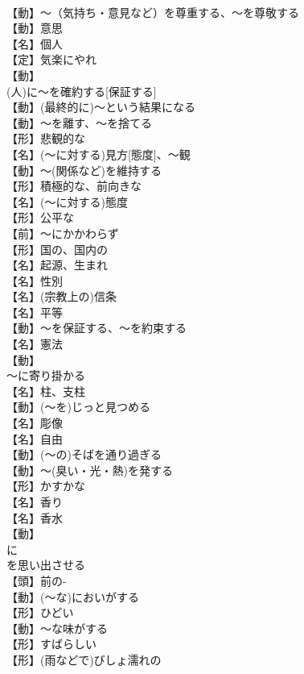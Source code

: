 \documentclass[8pt]{extreport}
\begin{document}
\begin{CJK}{UTF8}{min}
\\	【動】～（気持ち・意見など）を尊重する、～を尊敬する
\\	【動】意思
\\	【名】個人
\\	【定】気楽にやれ
\\	【動】
\\	(人)に～を確約する[保証する]
\\	【動】(最終的に)～という結果になる
\\	【動】～を離す、～を捨てる
\\	【形】悲観的な
\\	【名】(～に対する)見方[態度]、～観
\\	【動】～(関係など)を維持する
\\	【形】積極的な、前向きな
\\	【名】(～に対する)態度
\\	【形】公平な
\\	【前】～にかかわらず
\\	【形】国の、国内の
\\	【名】起源、生まれ
\\	【名】性別
\\	【名】(宗教上の)信条
\\	【名】平等
\\	【動】～を保証する、～を約束する
\\	【名】憲法
\\	【動】
\\	～に寄り掛かる
\\	【名】柱、支柱
\\	【動】(～を)じっと見つめる
\\	【名】彫像
\\	【名】自由
\\	【動】(～の)そばを通り過ぎる
\\	【動】～(臭い・光・熱)を発する
\\	【形】かすかな
\\	【名】香り
\\	【名】香水
\\	【動】
\\	に
\\	を思い出させる
\\	【頭】前の-
\\	【動】(～な)においがする
\\	【形】ひどい
\\	【動】～な味がする
\\	【形】すばらしい
\\	【形】(雨などで)びしょ濡れの

\end{CJK}
\end{document}
